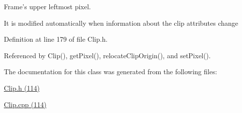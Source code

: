 Frame's upper leftmost pixel. 

It is modified automatically when information about the clip attributes change 

Definition at line 179 of file Clip.h.

Referenced by Clip(), getPixel(), relocateClipOrigin(), and setPixel().

The documentation for this class was generated from the following files:\begin{CompactItemize}
\item 
\hyperlink{_clip_8h}{Clip.h (114)}\item 
\hyperlink{_clip_8cpp}{Clip.cpp (114)}\end{CompactItemize}
